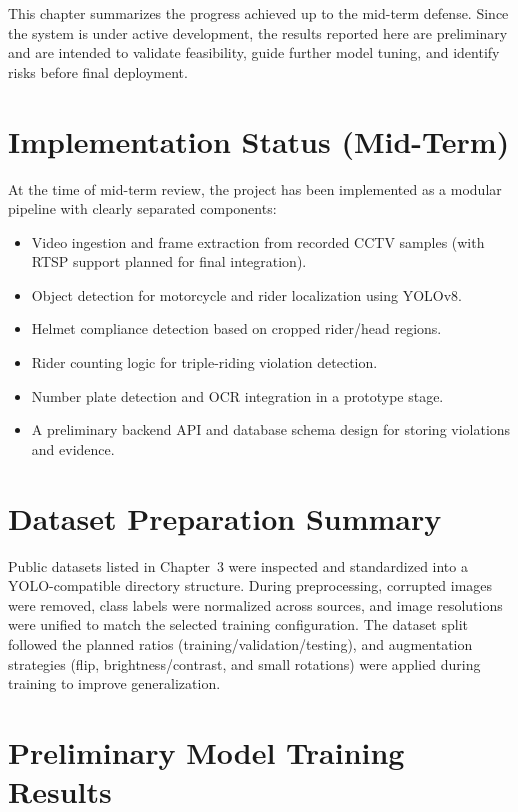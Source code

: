 
\label{ch:results-discussion}

This chapter summarizes the progress achieved up to the mid-term defense. Since the system is under active development, the results reported here are preliminary and are intended to validate feasibility, guide further model tuning, and identify risks before final deployment.

\section{Implementation Status (Mid-Term)}
\label{sec:impl-status}

At the time of mid-term review, the project has been implemented as a modular pipeline with clearly separated components:
\begin{itemize}
    \item Video ingestion and frame extraction from recorded CCTV samples (with RTSP support planned for final integration).
    \item Object detection for motorcycle and rider localization using YOLOv8.
    \item Helmet compliance detection based on cropped rider/head regions.
    \item Rider counting logic for triple-riding violation detection.
    \item Number plate detection and OCR integration in a prototype stage.
    \item A preliminary backend API and database schema design for storing violations and evidence.
\end{itemize}

\section{Dataset Preparation Summary}
\label{sec:dataset-summary}

Public datasets listed in Chapter~3 were inspected and standardized into a YOLO-compatible directory structure. During preprocessing, corrupted images were removed, class labels were normalized across sources, and image resolutions were unified to match the selected training configuration. The dataset split followed the planned ratios (training/validation/testing), and augmentation strategies (flip, brightness/contrast, and small rotations) were applied during training to improve generalization.

\section{Preliminary Model Training Results}
\label{sec:prelim-training}

